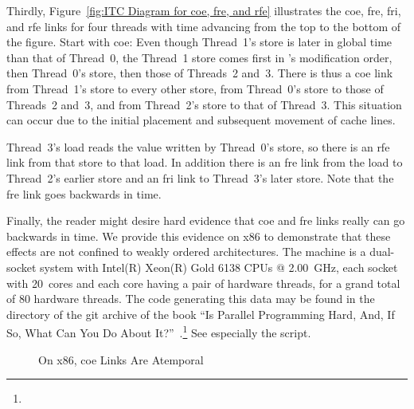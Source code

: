 \documentclass[10]{article}
\begin{document}
Thirdly, Figure~\ref{fig:ITC Diagram for coe, fre, and rfe} illustrates
the coe, fre, fri, and rfe links for four threads with time advancing
from the top to the bottom of the figure.  Start with coe: Even though
Thread~1's store is later in global time than that of Thread~0, the
Thread~1 store comes first in 's modification order, then Thread~0's
store, then those of Threads~2 and~3.
There is thus a coe link from Thread~1's store to every other store,
from Thread~0's store to those of Threads~2 and~3, and from Thread~2's
store to that of Thread~3.
This situation can occur due to the initial placement and subsequent
movement of cache lines.

Thread~3's load reads the value written by Thread~0's store, so there is
an rfe link from that store to that load.  In addition there is an fre link from
the load to Thread~2's earlier store and an fri link to Thread~3's later store.
Note that the fre link goes backwards in time.

Finally, the reader might desire hard evidence that coe and fre
links really can go backwards in time.
We provide this evidence on x86 to demonstrate that these effects
are not confined to weakly ordered architectures.
The machine is a dual-socket system with
Intel(R) Xeon(R) Gold 6138 CPUs @ 2.00~GHz,
each socket with 20~cores and each core having a pair of hardware
threads, for a grand total of 80 hardware threads.
The code generating this data may be found in the 
directory of the git archive of the book
``Is Parallel Programming Hard, And, If So, What Can You Do About
It?''~\cite{McKenney2018ParallelProgramming-2018-12-08a}.\footnote{
	}
See especially the  script.

\begin{figure}[tb]
\begin{center}
\caption{On x86, coe Links Are Atemporal}
\label{fig:On x86; coe Links Are Atemporal}
\end{center}
\end{figure}
\end{document}
